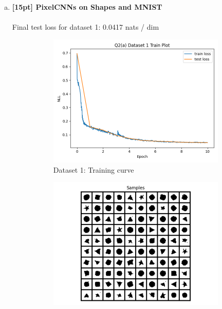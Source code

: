 \documentclass{article}
\begin{document}
\newpage
{}

\begin{enumerate}[(a)]
\item {\bf [15pt] PixelCNNs on Shapes and MNIST} \\\\
Final test loss for dataset 1: 0.0417 nats / dim
\begin{figure}[H]
    \centering
    \begin{subfigure}{0.45\textwidth}
        \centering
        \includegraphics[width=\textwidth]{figures/q2_a_dset1_train_plot.png}
        \caption{Dataset 1: Training curve}
    \end{subfigure}
    \hspace{0.2in}
    \begin{subfigure}{0.45\textwidth}
        \centering
        \includegraphics[width=\textwidth]{figures/q2_a_dset1_samples.png}

\end{subfigure}
\end{figure}
\end{enumerate}
\end{document}
